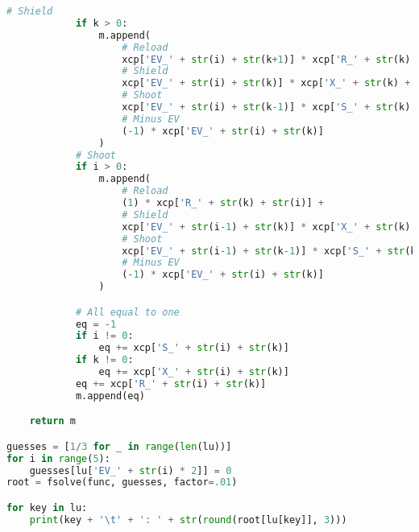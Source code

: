 \documentclass[11pt]{article}
\begin{document}
\begin{lstlisting}[language=Python]
            # Shield
            if k > 0:
                m.append(
                    # Reload
                    xcp['EV_' + str(i) + str(k+1)] * xcp['R_' + str(k) + str(i)] +
                    # Shield
                    xcp['EV_' + str(i) + str(k)] * xcp['X_' + str(k) + str(i)] +
                    # Shoot
                    xcp['EV_' + str(i) + str(k-1)] * xcp['S_' + str(k) + str(i)] +
                    # Minus EV
                    (-1) * xcp['EV_' + str(i) + str(k)]
                )
            # Shoot
            if i > 0:
                m.append(
                    # Reload
                    (1) * xcp['R_' + str(k) + str(i)] +
                    # Shield
                    xcp['EV_' + str(i-1) + str(k)] * xcp['X_' + str(k) + str(i)] +
                    # Shoot
                    xcp['EV_' + str(i-1) + str(k-1)] * xcp['S_' + str(k) + str(i)] +
                    # Minus EV
                    (-1) * xcp['EV_' + str(i) + str(k)]
                )

            # All equal to one
            eq = -1
            if i != 0:
                eq += xcp['S_' + str(i) + str(k)]
            if k != 0:
                eq += xcp['X_' + str(i) + str(k)]
            eq += xcp['R_' + str(i) + str(k)]
            m.append(eq)

    return m

guesses = [1/3 for _ in range(len(lu))]
for i in range(5):
    guesses[lu['EV_' + str(i) * 2]] = 0
root = fsolve(func, guesses, factor=.01)

for key in lu:
    print(key + '\t' + ': ' + str(round(root[lu[key]], 3)))
    

\end{lstlisting}
\end{document}
